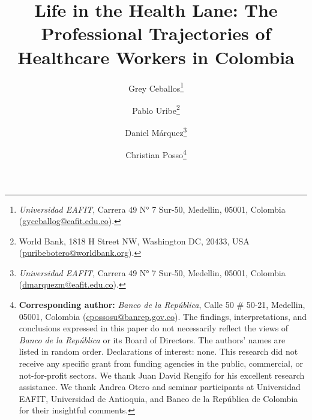 \documentclass[12pt, a4paper]{article}
\begin{document}
\renewcommand{\BOthers}[1]{et al.\hbox{}}
\newcommand\fnote[1]{\captionsetup{font=footnotesize}\caption*{#1}}


\title{\Large \textbf{Life in the Health Lane: The Professional Trajectories of Healthcare Workers in Colombia} \vspace{-0.1cm}}
\author{Grey Ceballos\thanks{\textit{Universidad EAFIT}, Carrera 49 N° 7 Sur-50, Medellin, 05001, Colombia (\href{mailto:gyceballog@eafit.edu.co}{gyceballog@eafit.edu.co}).} \and Pablo Uribe\thanks{World Bank, 1818 H Street NW, Washington DC, 20433, USA (\href{mailto:puribebotero@worldbank.org}{puribebotero@worldbank.org}).} \and Daniel Márquez\thanks{\textit{Universidad EAFIT}, Carrera 49 N° 7 Sur-50, Medellin, 05001, Colombia (\href{mailto:dmarquezm@eafit.edu.co}{dmarquezm@eafit.edu.co}).} \and Christian Posso\thanks{\textbf{Corresponding author:} \textit{Banco de la República}, Calle 50 \# 50-21, Medellin, 05001, Colombia (\href{mailto:cpossosu@banrep.gov.co}{cpossosu@banrep.gov.co}). The findings, interpretations, and conclusions expressed in this paper do not necessarily reflect the views of \textit{Banco de la República} or its Board of Directors. The authors’ names are listed in random order. Declarations of interest: none. This research did not receive any specific grant from funding agencies in the public, commercial, or not-for-profit sectors. We thank Juan David Rengifo for his excellent research assistance. We thank Andrea Otero and seminar participants at Universidad EAFIT, Universidad de Antioquia, and Banco de la República de Colombia for their insightful comments.}}
\maketitle

\vspace{-0.5cm}

\end{document}
